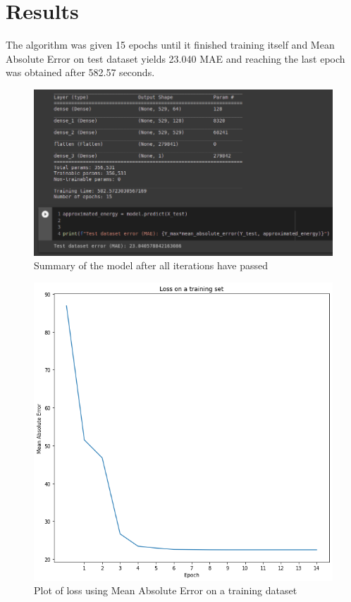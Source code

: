 \documentclass[a4paper,oneside,openright,11pt]{book}
\begin{document}
\section{Results}


The algorithm was given 15 epochs until it finished training itself and Mean Absolute Error on test dataset yields 23.040 MAE and reaching the last epoch was obtained after 582.57 seconds.

\begin{figure}[h!]
\centering
\includegraphics[scale=0.5]{DocumentFigures/ZdjeciaWalidacja/MAEtest.png}
\caption{Summary of the model after all iterations have passed}
\end{figure}




\begin{figure}[h!]
\centering
\includegraphics[scale=0.8]{DocumentFigures/ZdjeciaWalidacja/Losstraining.png}
\caption{Plot of loss using Mean Absolute Error on a training dataset}
\end{figure}
\end{document}

